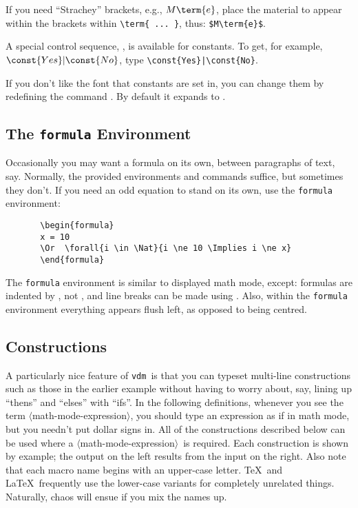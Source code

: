 \documentclass{article}
\newcommand{\Vdm}{{\tt vdm\/}}
\newenvironment{dangerous}{\par\vspace{5pt}\bgroup\small\noindent}%
                          {\par\egroup\vspace{5pt}}
\renewcommand{\^}[1]{$\langle${\rm #1\/}$\rangle$}
\newcommand{\mmexp}{\^{math-mode-expression}}
\newcommand{\cs}[1]{\leavevmode\hbox{\tt \string#1}}
\begin{document}
If you need ``Strachey'' brackets, e.g., $M\term{e}$, place the
material to appear within the brackets within \verb;\term{ ... };,
thus: \verb;$M\term{e}$;.

A special control sequence, \cs\const, is available for constants.
To get, for example, $\const{Yes}|\const{No}$, type
\verb;\const{Yes}|\const{No};.
\begin{dangerous}
If you don't like the font that constants are set in, you can change
them by redefining the command \cs\constantFont.  By
default it expands to \cs\sc.
\end{dangerous}

\subsection{The {\tt formula} Environment}

Occasionally you may want a formula on its own, between paragraphs of
text, say.  Normally, the provided environments and commands suffice,
but sometimes they don't.  If you need an odd equation to stand on its
own, use the {\tt formula} environment:
\begin{verbatim}
       \begin{formula}
       x = 10
       \Or  \forall{i \in \Nat}{i \ne 10 \Implies i \ne x}
       \end{formula}
\end{verbatim}
\sloppy
The {\tt formula} environment is similar to displayed math mode,
except: formulas are indented by \cs\VDMindent, not
\cs\mathindent, and line breaks can be made using \cs\\.
Also, within the {\tt formula} environment everything appears flush
left, as opposed to being centred.

\subsection{Constructions}

A particularly nice feature of \Vdm\ is that you can typeset multi-line
constructions such as those in the earlier example without having to
worry about, say, lining up ``thens'' and ``elses'' with ``ifs''.
In the following definitions, whenever you see the term \mmexp, you
should type an expression as if in math mode, but you needn't put
dollar signs in.  All of the constructions described below can be used
where a \mmexp\ is required.  Each construction is shown by example;
the output on the left results from the input on the right.
Also note that each macro name begins with an upper-case letter.
\TeX\ and \LaTeX\ frequently use the lower-case variants for
completely unrelated things.  Naturally, chaos will ensue if you mix
the names up.
\end{document}
